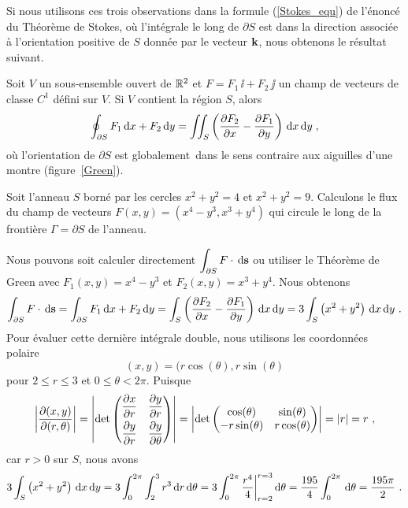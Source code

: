 {Si nous utilisons ces trois observations dans la formule
(\ref{Stokes_equ}) de l'énoncé du Théorème de Stokes, où 
l'intégrale le long de $\partial S$ est dans la direction associée à
l'orientation positive de $S$ donnée par le vecteur $\mathbf{k}$,
nous obtenons le résultat suivant.

\begin{focus}{\thm}
Soit $V$ un sous-ensemble ouvert de $\mathbb{R}^2$ et
$F=F_1\,\ii + F_2\,\jj$ un champ de vecteurs de classe $C^1$
défini sur $V$.  Si $V$ contient la région $S$, alors 
\begin{equation}\label{Green_th}
\oint_{\partial S} F_1 \,\mathrm{d}x + F_2 \,\mathrm{d}y = \iint_S \left(\frac{\partial F_2}{\partial x} -
  \frac{\partial F_1}{\partial y}\right)\,\mathrm{d}x\,\mathrm{d}y \; ,
\end{equation}
où l'orientation de $\partial S$ est \lgm globalement\rgm\ dans le
sens contraire aux aiguilles d'une montre (figure~\ref{Green}).
\end{focus}


\begin{egg}
Soit l'anneau $S$ borné par les cercles $x^2+y^2 = 4$ et $x^2+y^2 = 9$.
Calculons le flux du champ de vecteurs
$F(x,y) = (x^4-y^3, x^3 + y^4)$ qui circule le long de la frontière
$\Gamma = \partial S$ de l'anneau.

Nous pouvons soit calculer directement
$\displaystyle \int_{\partial S} F \cdot \,\mathrm{d}\mathbf{s}$
ou utiliser le Théorème de Green avec $F_1(x,y) = x^4 - y^3$
et $F_2(x,y) = x^3 + y^4$.   Nous obtenons
\[
\int_{\partial S} F \cdot \,\mathrm{d}\mathbf{s}
= \int_{\partial S} F_1 \,\mathrm{d}x + F_2 \,\mathrm{d}y
= \int_S \left(\frac{\partial F_2}{\partial x} - \frac{\partial F_1}{\partial y} \right) \,\mathrm{d}x\,\mathrm{d}y
= 3 \int_S \left(x^2 + y^2 \right) \,\mathrm{d}x\,\mathrm{d}y \ .
\]
Pour évaluer cette dernière intégrale double, nous utilisons les
coordonnées polaire
\[
  (x,y) = (r\cos(\theta), r\sin(\theta)
\]
pour $2 \leq r \leq 3$ et $0 \leq \theta < 2 \pi$.  Puisque
\[
\left| \frac{\partial(x,y)}{\partial(r,\theta)} \right|
= \left| \det \begin{pmatrix} \displaystyle \frac{\partial x}{\partial r} &
\displaystyle \frac{\partial y}{\partial r} \\[0.7em]
\displaystyle \frac{\partial y}{\partial r} & \displaystyle \frac{\partial y}{\partial \theta}
\end{pmatrix} \right|
= \left| \det \begin{pmatrix} \cos(\theta) & \sin(\theta) \\
-r \sin(\theta) & r \cos(\theta) \end{pmatrix} \right|
= |r| = r \ ,
\]
car $r>0$ sur $S$, nous avons
\[
3 \int_S \left(x^2 + y^2 \right) \,\mathrm{d}x\,\mathrm{d}y
= 3 \int_0^{2\pi} \int_2^3 r^3 \,\mathrm{d}r\,\mathrm{d}\theta
= 3 \int_0^{2\pi} \frac{r^4}{4}\bigg|_{r=2}^{r=3} \,\mathrm{d}\theta
= \frac{195}{4} \int_0^{2\pi} \,\mathrm{d}\theta
= \frac{195\pi}{2} \ .
\]


\end{egg}}
